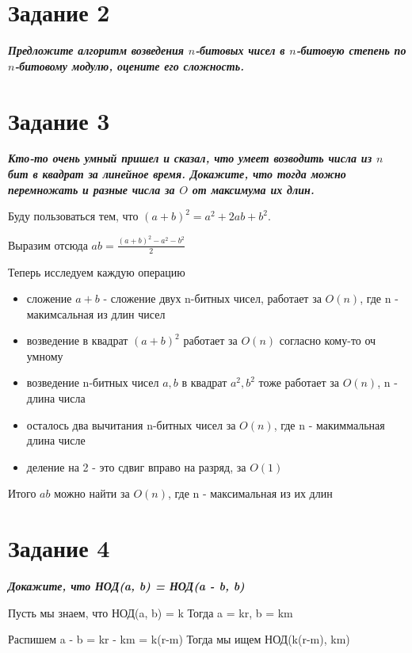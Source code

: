 \documentclass{article}
\begin{document}
\bigskip

\section*{\textbf{Задание 2}} \textbf{\textit{Предложите алгоритм возведения $n$-битовых чисел в $n$-битовую степень по $n$-битовому модулю, оцените его сложность.
}}



\bigskip


\section*{\textbf{Задание 3}} \textbf{\textit{Кто-то очень умный пришел и сказал, что умеет возводить числа из $n$ бит в квадрат за линейное время. Докажите, что тогда можно перемножать и разные числа за $O$ от максимума их длин.}}

Буду пользоваться тем, что $(a + b)^2 = a^2 + 2ab + b^2$.

Выразим отсюда $ab = \frac{(a + b)^2 - a^2 - b^2}{2}$

Теперь исследуем каждую операцию
\begin{itemize}
    \item сложение $a+b$ - сложение двух n-битных чисел, работает за $O(n)$, где n - макимсальная из длин чисел
    \item возведение в квадрат $(a+b)^2$ работает за $O(n)$ согласно кому-то оч умному
    \item возведение n-битных чисел $a, b$ в квадрат $a^2, b^2$ тоже работает за $O(n)$, n - длина числа
    \item осталось два вычитания n-битных чисел за $O(n)$, где n - макиммальная длина числе
    \item деление на 2 - это сдвиг вправо на разряд, за $O(1)$
\end{itemize}

Итого $ab$ можно найти за $O(n)$, где n - максимальная из их длин

\bigskip


\section*{\textbf{Задание 4}} \textbf{\textit{Докажите, что НОД(a, b) = НОД(a - b, b)}}

Пусть мы знаем, что НОД(a, b) = k
Тогда a = kr, b = km

Распишем a - b = kr - km = k(r-m)
Тогда мы ищем НОД(k(r-m), km)
\end{document}
